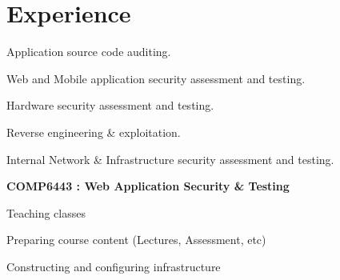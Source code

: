 \documentclass[letterpaper]{deedy-resume} %
\begin{document}
\begin{minipage}[t]{0.65\textwidth} %



\section{Experience}
\vspace{\topsep}

\vspace{\topsep} %
\vspace{\topsep} %
\begin{tightitemize}
\item Application source code auditing.
\item Web and Mobile application security assessment and testing.
\item Hardware security assessment and testing.
\item Reverse engineering \& exploitation.
\item Internal Network \& Infrastructure security assessment and testing.
\end{tightitemize}

\sectionspace %
\sectionspace %


\vspace{\topsep} %
\textbf{COMP6443 : Web Application Security \& Testing}
\vspace{2pt}
\begin{tightitemize}
\item Teaching classes
\item Preparing course content (Lectures, Assessment, etc)
\item Constructing and configuring infrastructure
\end{tightitemize}

\sectionspace %
\sectionspace %


\end{minipage}
\end{document}
